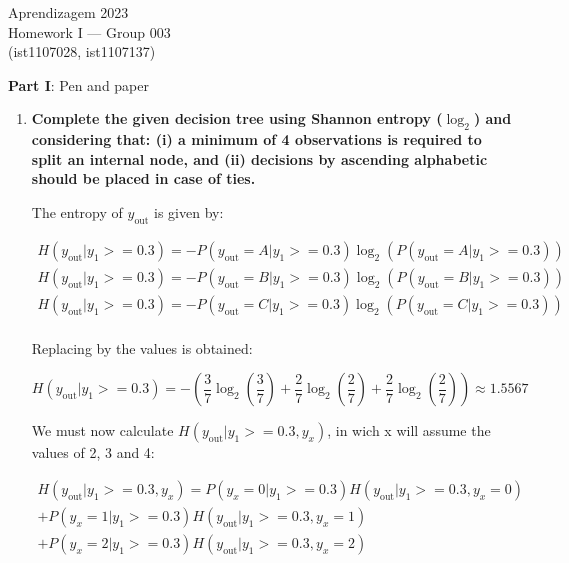 \documentclass[12pt]{article}
\begin{document}
\begin{center}
Aprendizagem 2023\\
Homework I --- Group 003\\
(ist1107028, ist1107137)\vskip 1cm
\end{center}

\large{\textbf{Part I}: Pen and paper}\normalsize

\begin{enumerate}[leftmargin=\labelsep]
\item \textbf{Complete the given decision tree using Shannon entropy ($\log_2$) and considering that:
    (i) a minimum of 4 observations is required to split an internal node, and (ii) decisions by ascending alphabetic should be placed in case of ties.}

\vspace{1em}
The entropy of $y_\text{out}$ is given by:

\begin{equation*}
    \begin{split}
        H(y_{\text{out}}|y_1 >= 0.3) = - P(y_{\text{out}} = A|y_1 >= 0.3)\log_2(P(y_{\text{out}} = A|y_1 >= 0.3)) \\
        H(y_{\text{out}}|y_1 >= 0.3) = - P(y_{\text{out}} = B|y_1 >= 0.3)\log_2(P(y_{\text{out}} = B|y_1 >= 0.3)) \\
        H(y_{\text{out}}|y_1 >= 0.3) = - P(y_{\text{out}} = C|y_1 >= 0.3)\log_2(P(y_{\text{out}} = C|y_1 >= 0.3)) \\
    \end{split}
\end{equation*}

Replacing by the values is obtained:

\begin{equation*}
    H(y_{\text{out}}|y_1 >= 0.3) = - \left( \frac{3}{7} \log_2 \left( \frac{3}{7} \right) + \frac{2}{7} \log_2 \left( \frac{2}{7} \right) + \frac{2}{7} \log_2 \left( \frac{2}{7} \right) \right) \approx  1.5567
\end{equation*}

\vspace{0.5em}
We must now calculate $H(y_{\text{out}} | y_1 >= 0.3, y_x)$, in wich x will assume the values of 2, 3 and 4:

\begin{equation}
    \label{H-y_out}
    \begin{split}
    H(y_{\text{out}} | y_1 >= 0.3, y_x) = P(y_x = 0 | y_1 >= 0.3) H(y_{\text{out}} | y_1 >= 0.3, y_x = 0) \\
    + P(y_x = 1 | y_1 >= 0.3) H(y_{\text{out}} | y_1 >= 0.3, y_x = 1) \\
    + P(y_x = 2 | y_1 >= 0.3) H(y_{\text{out}} | y_1 >= 0.3, y_x = 2)
    \end{split}
\end{equation}


\end{enumerate}
\end{document}
